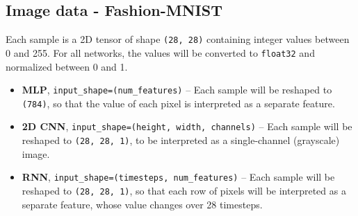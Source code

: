 \subsection{Image data - Fashion-MNIST}
\label{preprocessing-image}
Each sample is a 2D tensor of shape \texttt{(28, 28)} containing integer values between 0 and 255.
For all networks, the values will be converted to \texttt{float32} and normalized between 0 and 1.
\begin{itemize}
    \item \textbf{MLP}, \texttt{input\_shape=(num\_features)} -- Each sample will be reshaped to \texttt{(784)},
    so that the value of each pixel is interpreted as a separate feature.
    \item \textbf{2D CNN}, \texttt{input\_shape=(height, width, channels)} -- Each sample will be reshaped to
    \texttt{(28, 28, 1)}, to be interpreted as a single-channel (grayscale) image.
    \item \textbf{RNN}, \texttt{input\_shape=(timesteps, num\_features)} -- Each sample will be reshaped to
    \texttt{(28, 28, 1)}, so that each row of pixels will be interpreted as a separate feature, whose value
    changes over 28 timesteps.
\end{itemize}


